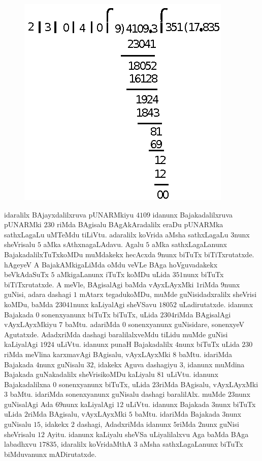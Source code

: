 \begin{figure}[H]
\centering
\includegraphics[scale=1.5]{5.eps}
\end{figure}

idaralilx BAjayxdalilxruva pUNARMkiyu $4109$ idanunx Bajakadalilxruva pUNARMki $230$ riMda BAgi\-salu BAgAkAradalilx eraDu pUNARMka sathxLagaLu uMTeMdu tiLiVtu. adaralilx koVrida aMsha sathxLagaLu $3$nunx sheVrisalu $5$ aMka  sAthxnagaLAdavu. Agalu $5$ aMka sathxLagaLanunx BajakadalilxTuTxkoMDu muMdakekx hecAcxda $9$nunx biTuTx biTiTxrutatxde. hAgeyeV A BajakAMkigaLiMda oMdu veVLe BAga hoVguvadakekx beVkAdaSuTx $5$ aMkigaLanunx iTuTx koMDu uLida $351$nunx biTuTx biTiTxrutatxde. A meVle, BAgisalAgi baMda vAyxLAyxMki $1$riMda $9$nunx guNisi, adara dashagi $1$ mAtarx tegadukoMDu, muMde guNisidadxralilx sheVrisi koMDu, baMda $23041$nunx kaLiyalAgi sheVSavu $18052$ uLadirutatxde. idanunx Bajakada $0$ sonenxyanunx biTuTx biTuTx, uLida $2304$riMda BAgisalAgi vAyxLAyxMkiyu $7$ baMtu. adariMda $0$ sonenxyanunx guNisidare, sonenxyeV Agutatxde. AdadxriMda dashagi bara\-lilalxveMdu tiLidu muMde guNisi kaLiyalAgi $1924$ uLiVtu. idanunx punaH Bajakadalilx $4$nunx biTuTx uLida $230$riMda meVlina karxmavAgi BAgisalu, vAyxLAyxMki $8$ baMtu. idariMda Bajakada $4$nunx guNisalu $32$, idakekx Aguva dashagiyu $3$, idanunx muMdina Bajakada guNakadalilx sheVrisikoMDu kaLiyalu $81$ uLiVtu. idanunx Bajakadalilxna $0$ sonenxyanunx biTuTx, uLida $23$riMda BAgi\-salu, vAyxLAyxMki $3$ baMtu. idariMda sonenxyanunx guNisalu dashagi baralilAlx. muMde $23$nunx guNisalAgi Ada $69$nunx kaLiyalAgi $12$ uLiVtu. idanunx Bajakada $3$nunx biTuTx uLida $2$riMda BAgisalu, vAyxLAyxMki $5$ baMtu. idariMda Bajakada $3$nunx guNisalu $15$, idakekx $2$ dashagi, AdadxriMda idanunx $5$riMda $2$nunx guNisi sheVrisalu $12$ Ayitu. idanunx kaLiyalu sheVSa uLiyalilalxvu Aga baMda BAga labadhxvu $17835$, idaralilx koVridaMthA $3$ aMsha sathxLagaLanunx biTuTx biMduvanunx mADirutatxde.\\

